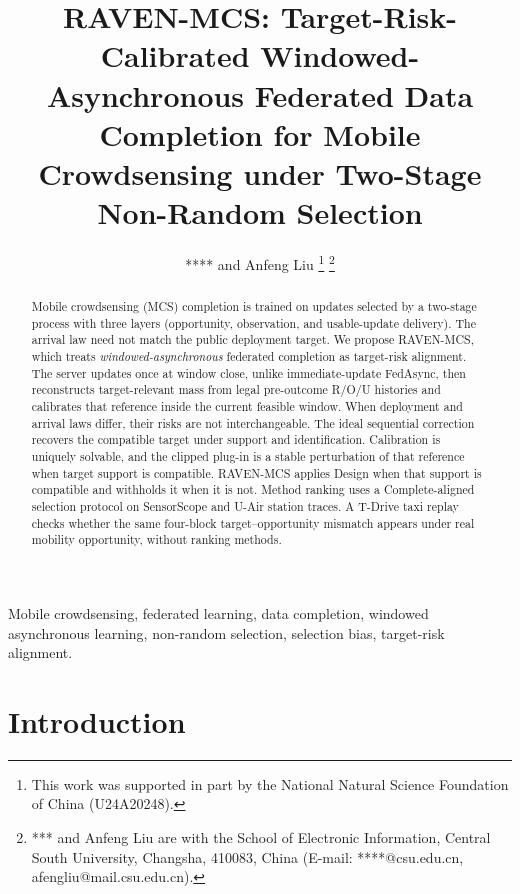 \documentclass[letterpaper,journal]{IEEEtran}
\begin{document}
\title{RAVEN-MCS: Target-Risk-Calibrated Windowed-Asynchronous Federated Data Completion for Mobile Crowdsensing under Two-Stage Non-Random Selection}

\author{**** and Anfeng Liu%
\thanks{This work was supported in part by the National Natural Science Foundation of China (U24A20248).}%
\thanks{*** and Anfeng Liu are with the School of Electronic Information, Central South University, Changsha, 410083, China (E-mail: ****@csu.edu.cn, afengliu@mail.csu.edu.cn).}%
}


\maketitle


\begin{abstract}
Mobile crowdsensing (MCS) completion is trained on updates selected by a
two-stage process with three layers (opportunity, observation, and
usable-update delivery).  The arrival law need not match the public
deployment target.  We propose RAVEN-MCS, which treats
\emph{windowed-asynchronous} federated completion as target-risk alignment.
The server updates once at window close, unlike immediate-update FedAsync,
then reconstructs target-relevant mass from legal pre-outcome R/O/U
histories and calibrates that reference inside the current feasible window.
When deployment and arrival laws differ, their risks are not interchangeable.
The ideal sequential correction recovers the compatible target under support
and identification.  Calibration is uniquely solvable, and the clipped
plug-in is a stable perturbation of that reference when target support is
compatible.  RAVEN-MCS applies Design when that support is compatible and
withholds it when it is not.  Method ranking uses a Complete-aligned
selection protocol on SensorScope and U-Air station traces.  A T-Drive taxi replay checks whether the same four-block
target--opportunity mismatch appears under real mobility opportunity,
without ranking methods.
\end{abstract}

\begin{IEEEkeywords}
Mobile crowdsensing, federated learning, data completion, windowed asynchronous learning, non-random selection, selection bias, target-risk alignment.
\end{IEEEkeywords}


\section{Introduction}
\label{sec:introduction}
\end{document}
